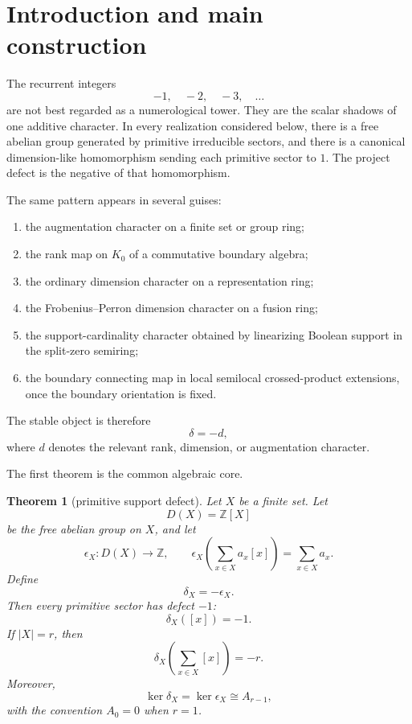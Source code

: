 \documentclass[11pt]{article}
\newtheorem{theorem}{Theorem}[section]
\theoremstyle{remark}
\newcommand{\ZZ}{\mathbb Z}
\begin{document}
\tableofcontents

\section{Introduction and main construction}

The recurrent integers
\[
        -1,
        \quad -2,
        \quad -3,
        \quad \ldots
\]
are not best regarded as a numerological tower.  They are the scalar shadows of one additive character.  In every realization considered below, there is a free abelian group generated by primitive irreducible sectors, and there is a canonical dimension-like homomorphism sending each primitive sector to $1$.  The project defect is the negative of that homomorphism.

The same pattern appears in several guises:
\begin{enumerate}[label=(\roman*)]
\item the augmentation character on a finite set or group ring;
\item the rank map on $K_0$ of a commutative boundary algebra;
\item the ordinary dimension character on a representation ring;
\item the Frobenius--Perron dimension character on a fusion ring;
\item the support-cardinality character obtained by linearizing Boolean support in the split-zero semiring;
\item the boundary connecting map in local semilocal crossed-product extensions, once the boundary orientation is fixed.
\end{enumerate}
The stable object is therefore
\[
        \delta=-d,
\]
where $d$ denotes the relevant rank, dimension, or augmentation character.

The first theorem is the common algebraic core.

\begin{theorem}[primitive support defect]
Let $X$ be a finite set.  Let
\[
        D(X)=\ZZ[X]
\]
be the free abelian group on $X$, and let
\[
        \epsilon_X:D(X)\to\ZZ,
        \qquad
        \epsilon_X\left(\sum_{x\in X}a_x[x]\right)=\sum_{x\in X}a_x.
\]
Define
\[
        \delta_X=-\epsilon_X.
\]
Then every primitive sector has defect $-1$:
\[
        \delta_X([x])=-1.
\]
If $|X|=r$, then
\[
        \delta_X\left(\sum_{x\in X}[x]\right)=-r.
\]
Moreover,
\[
        \ker\delta_X=\ker\epsilon_X\cong A_{r-1},
\]
with the convention $A_0=0$ when $r=1$.
\end{theorem}
\end{document}
